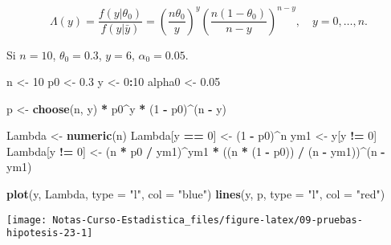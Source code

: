 \documentclass[
  12pt,
]{book}
\newenvironment{Shaded}{\begin{snugshade}}{\end{snugshade}}
\newcommand{\DataTypeTok}[1]{\textcolor[rgb]{0.13,0.29,0.53}{#1}}
\newcommand{\DecValTok}[1]{\textcolor[rgb]{0.00,0.00,0.81}{#1}}
\newcommand{\FloatTok}[1]{\textcolor[rgb]{0.00,0.00,0.81}{#1}}
\newcommand{\KeywordTok}[1]{\textcolor[rgb]{0.13,0.29,0.53}{\textbf{#1}}}
\newcommand{\NormalTok}[1]{#1}
\newcommand{\OperatorTok}[1]{\textcolor[rgb]{0.81,0.36,0.00}{\textbf{#1}}}
\newcommand{\StringTok}[1]{\textcolor[rgb]{0.31,0.60,0.02}{#1}}
\begin{document}
\[\Lambda(y) = \dfrac{f(y|\theta_0)}{f(y|\bar y)} = \left(\dfrac{n\theta_0}{y}\right)^y\left(\dfrac{n(1-\theta_0)}{n-y}\right)^{n-y}, \quad y=0,\dots,n.\]

Si \(n=10\), \(\theta_0 = 0.3\), \(y = 6\), \(\alpha_0=0.05\).

\begin{Shaded}
\begin{Highlighting}[]
\NormalTok{n \textless{}{-}}\StringTok{ }\DecValTok{10}
\NormalTok{p0 \textless{}{-}}\StringTok{ }\FloatTok{0.3}
\NormalTok{y \textless{}{-}}\StringTok{ }\DecValTok{0}\OperatorTok{:}\DecValTok{10}
\NormalTok{alpha0 \textless{}{-}}\StringTok{ }\FloatTok{0.05}

\NormalTok{p \textless{}{-}}\StringTok{ }\KeywordTok{choose}\NormalTok{(n, y) }\OperatorTok{*}\StringTok{ }\NormalTok{p0}\OperatorTok{\^{}}\NormalTok{y }\OperatorTok{*}\StringTok{ }\NormalTok{(}\DecValTok{1} \OperatorTok{{-}}\StringTok{ }\NormalTok{p0)}\OperatorTok{\^{}}\NormalTok{(n }\OperatorTok{{-}}\StringTok{ }\NormalTok{y)}


\NormalTok{Lambda \textless{}{-}}\StringTok{ }\KeywordTok{numeric}\NormalTok{(n)}
\NormalTok{Lambda[y }\OperatorTok{==}\StringTok{ }\DecValTok{0}\NormalTok{] \textless{}{-}}\StringTok{ }\NormalTok{(}\DecValTok{1} \OperatorTok{{-}}\StringTok{ }\NormalTok{p0)}\OperatorTok{\^{}}\NormalTok{n}
\NormalTok{ym1 \textless{}{-}}\StringTok{ }\NormalTok{y[y }\OperatorTok{!=}\StringTok{ }\DecValTok{0}\NormalTok{]}
\NormalTok{Lambda[y }\OperatorTok{!=}\StringTok{ }\DecValTok{0}\NormalTok{] \textless{}{-}}\StringTok{ }\NormalTok{(n }\OperatorTok{*}\StringTok{ }\NormalTok{p0 }\OperatorTok{/}\StringTok{ }\NormalTok{ym1)}\OperatorTok{\^{}}\NormalTok{ym1 }\OperatorTok{*}\StringTok{ }\NormalTok{((n }\OperatorTok{*}\StringTok{ }\NormalTok{(}\DecValTok{1} \OperatorTok{{-}}\StringTok{ }\NormalTok{p0)) }\OperatorTok{/}\StringTok{ }\NormalTok{(n }\OperatorTok{{-}}\StringTok{ }\NormalTok{ym1))}\OperatorTok{\^{}}\NormalTok{(n }\OperatorTok{{-}}\StringTok{ }\NormalTok{ym1)}

\KeywordTok{plot}\NormalTok{(y, Lambda, }\DataTypeTok{type =} \StringTok{"l"}\NormalTok{, }\DataTypeTok{col =} \StringTok{"blue"}\NormalTok{)}
\KeywordTok{lines}\NormalTok{(y, p, }\DataTypeTok{type =} \StringTok{"l"}\NormalTok{, }\DataTypeTok{col =} \StringTok{"red"}\NormalTok{)}
\end{Highlighting}
\end{Shaded}

\begin{center}\texttt{[image: Notas-Curso-Estadistica\_files/figure-latex/09-pruebas-hipotesis-23-1]} \end{center}
\end{document}
